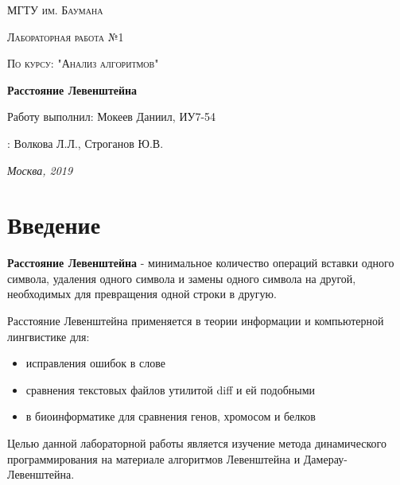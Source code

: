\documentclass[12pt]{report}
\begin{document}
\begin{titlepage}
	\centering
	{\scshape\LARGE МГТУ им. Баумана \par}
	\vspace{3cm}
	{\scshape\Large Лабораторная работа №1\par}
	\vspace{0.5cm}	
	{\scshape\Large По курсу: "Анализ алгоритмов"\par}
	\vspace{1.5cm}
	{\huge\bfseries Расстояние Левенштейна\par}
	\vspace{2cm}
	\Large Работу выполнил: Мокеев Даниил, ИУ7-54\par
	\vspace{0.5cm}
	:  Волкова Л.Л., Строганов Ю.В.\par

	\vfill
	\large \textit {Москва, 2019} \par
\end{titlepage}

\tableofcontents

\newpage
\chapter*{Введение}
\textbf{Расстояние Левенштейна} - минимальное количество операций вставки одного символа, удаления одного символа и замены одного символа на другой, необходимых для превращения одной строки в другую.

Расстояние Левенштейна применяется в теории информации и компьютерной лингвистике для:

\begin{itemize}
	\item исправления ошибок в слове
	\item сравнения текстовых файлов утилитой diff и ей подобными
	\item в биоинформатике для сравнения генов, хромосом и белков
\end{itemize}

Целью данной лабораторной работы является изучение метода динамического программирования на материале алгоритмов
Левенштейна и Дамерау-Левенштейна. 
\end{document}
